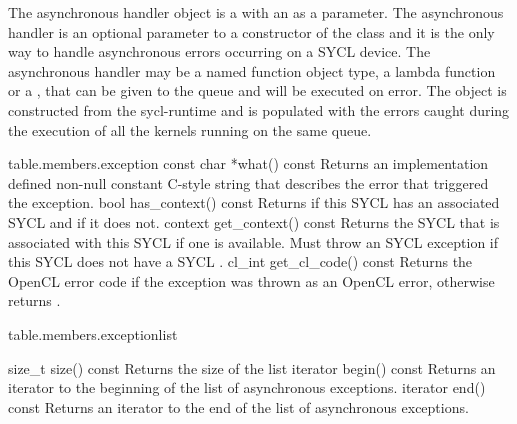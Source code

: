 The asynchronous handler object  is a
 with an  as a parameter.
The asynchronous handler is an optional parameter to a constructor of the
 class and it is the only way to handle asynchronous errors
occurring on a SYCL device. The asynchronous handler may be a named function object
type, a lambda function or a ,
that can be given to the queue and 
will be executed on error. The  object is constructed
from the \gls{sycl-runtime} and is populated with the errors caught during the
execution of all the kernels running on the same queue.


{table.members.exception}
  \addRow
    {const char *what() const}
    {Returns an implementation defined non-null constant C-style string that describes the error that triggered the exception.}
  \addRow
    {bool has_context() const}
    {Returns  if this SYCL  has an associated SYCL  and  if it does not.}
  \addRow
    {context get_context() const}
    {Returns the SYCL  that is associated with this SYCL  if one is available. Must throw an  SYCL exception if this SYCL  does not have a SYCL .
    }
  \addRow
    {cl_int get_cl_code() const}
    {
      Returns the OpenCL error code if the exception was thrown as an OpenCL error, otherwise returns .
    }
\completeTable


{table.members.exceptionlist}

\addRow
{ size_t size() const }
{ Returns the size of the list }
\addRow
 {iterator begin() const }
 {Returns an iterator to the beginning of the list of asynchronous exceptions.}
\addRow
 {iterator end() const}
 {Returns an iterator to the end of the list of asynchronous exceptions.}

